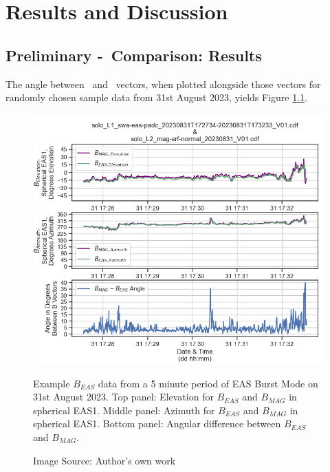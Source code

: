 \chapter{Results and Discussion}
\label{chapterlabel3}

\section{Preliminary \Beas-\Bmag\ Comparison: Results} \label{prelim results}
The angle between \Beas\ and \Bmag\ vectors, when plotted alongside those vectors for randomly chosen sample data from 31st August 2023, yields Figure \ref{fig: angle example august}.
\\

\begin{figure}[h!]
    \centering
    \centerfloat
    \includegraphics[width=1.05\linewidth]{figures/Angle Example.png}
    \caption{Example \(B_{EAS}\) data from a 5 minute period of EAS Burst Mode on 31st August 2023. Top panel: Elevation for \(B_{EAS}\) and \(B_{MAG}\) in spherical EAS1. Middle panel: Azimuth for \(B_{EAS}\) and \(B_{MAG}\) in spherical EAS1. Bottom panel: Angular difference between \(B_{EAS}\) and \(B_{MAG}\).}
    \caption*{Image Source: Author's own work}
    \label{fig: angle example august}
\end{figure}

